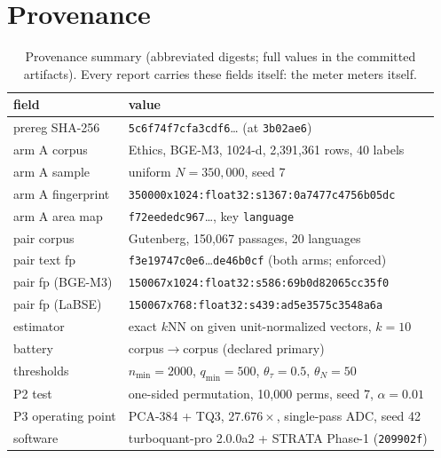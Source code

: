 \documentclass[11pt]{article}
\begin{document}



\appendix

\section{Provenance}
\label{app:provenance}

\begin{table}[h]
\centering
\scriptsize
\setlength{\tabcolsep}{3pt}
\begin{tabular}{ll}
\toprule
field & value \\
\midrule
prereg SHA-256 & \texttt{5c6f74f7cfa3cdf6}\ldots{} (at \texttt{3b02ae6}) \\
arm A corpus & Ethics, BGE-M3, 1024-d, 2{,}391{,}361 rows, 40 labels \\
arm A sample & uniform $N = 350{,}000$, seed 7 \\
arm A fingerprint & \texttt{350000x1024:float32:s1367:0a7477c4756b05dc} \\
arm A area map & \texttt{f72eededc967}\ldots{}, key \texttt{language} \\
pair corpus & Gutenberg, 150{,}067 passages, 20 languages \\
pair text fp & \texttt{f3e19747c0e6}\ldots{}\texttt{de46b0cf} (both arms; enforced) \\
pair fp (BGE-M3) & \texttt{150067x1024:float32:s586:69b0d82065cc35f0} \\
pair fp (LaBSE) & \texttt{150067x768:float32:s439:ad5e3575c3548a6a} \\
estimator & exact $k$NN on given unit-normalized vectors, $k=10$ \\
battery & corpus$\to$corpus (declared primary) \\
thresholds & $n_{\min}=2000$, $q_{\min}=500$, $\theta_\tau=0.5$, $\theta_N=50$ \\
P2 test & one-sided permutation, 10{,}000 perms, seed 7, $\alpha=0.01$ \\
P3 operating point & PCA-384 + TQ3, $27.676\times$, single-pass ADC, seed 42 \\
software & turboquant-pro 2.0.0a2 + STRATA Phase-1 (\texttt{209902f}) \\
\bottomrule
\end{tabular}
\caption{Provenance summary (abbreviated digests; full values in the
committed artifacts). Every report carries these fields itself: the meter
meters itself.}
\label{tab:provenance}
\end{table}
\end{document}
